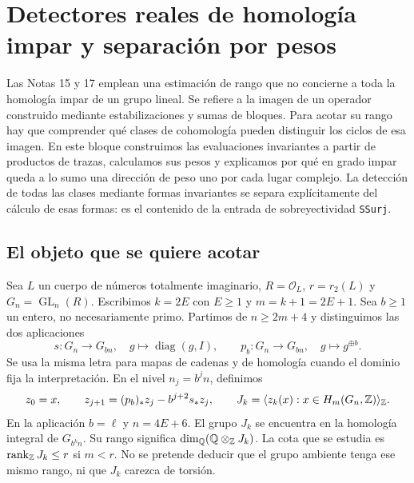 \section{Detectores reales de homología impar y separación por pesos}
\label{sec:detectores-reales}

Las Notas 15 y 17 emplean una estimación de rango que no concierne a toda la homología impar de un grupo lineal. Se refiere a la imagen de un operador construido mediante estabilizaciones y sumas de bloques. Para acotar su rango hay que comprender qué clases de cohomología pueden distinguir los ciclos de esa imagen. En este bloque construimos las evaluaciones invariantes a partir de productos de trazas, calculamos sus pesos y explicamos por qué en grado impar queda a lo sumo una dirección de peso uno por cada lugar complejo. La detección de todas las clases mediante formas invariantes se separa explícitamente del cálculo de esas formas: es el contenido de la entrada de sobreyectividad \texttt{SSurj}.

\subsection{El objeto que se quiere acotar}

Sea $L$ un cuerpo de números totalmente imaginario, $R=\mathcal O_L$, $r=r_2(L)$ y $G_n=\operatorname{GL}_n(R)$. Escribimos $k=2E$ con $E\ge1$ y $m=k+1=2E+1$. Sea $b\ge1$ un entero, no necesariamente primo. Partimos de $n\ge2m+4$ y distinguimos las dos aplicaciones
\begin{equation}
 s:G_n\longrightarrow G_{bn},\quad g\longmapsto\operatorname{diag}(g,I),
 \qquad p_b:G_n\longrightarrow G_{bn},\quad g\longmapsto g^{\oplus b}.
 \label{eq:dr-mapas}
\end{equation}
Se usa la misma letra para mapas de cadenas y de homología cuando el dominio fija la interpretación. En el nivel $n_j=b^jn$, definimos
\begin{equation}
 z_0=x,\qquad z_{j+1}= (p_b)_* z_j-b^{j+2}s_*z_j,
 \qquad J_k=\langle z_k(x):x\in H_m(G_n,\mathbb{Z})\rangle_{\mathbb{Z}}.
 \label{eq:dr-filtro}
\end{equation}
En la aplicación $b=\ell$ y $n=4E+6$. El grupo $J_k$ se encuentra en la homología integral de $G_{b^kn}$. Su rango significa $\dim_{\mathbb{Q}}(\mathbb{Q}\otimes_{\mathbb{Z}} J_k)$. La cota que se estudia es $\operatorname{rank}_{\mathbb{Z}}J_k\le r$ si $m<r$. No se pretende deducir que el grupo ambiente tenga ese mismo rango, ni que $J_k$ carezca de torsión.


